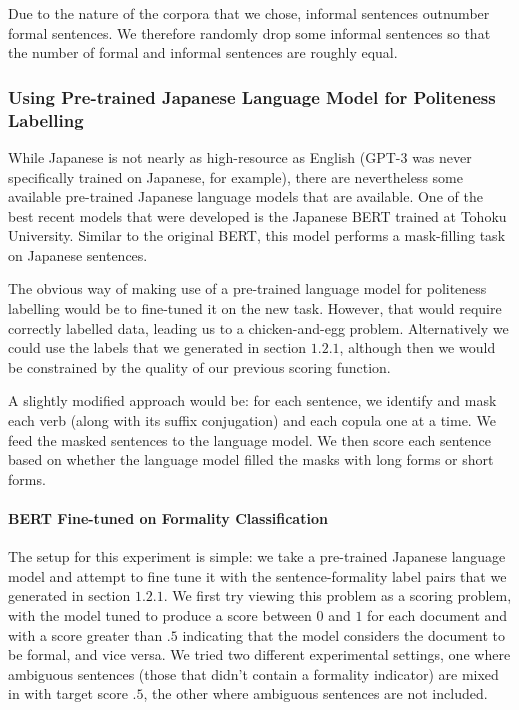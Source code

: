 \documentclass[11pt]{article}
\begin{document}
Due to the nature of the corpora that we chose, informal sentences outnumber formal sentences. We therefore randomly drop some informal sentences so that the number of formal and informal sentences are roughly equal.

\subsubsection{Using Pre-trained Japanese Language Model for Politeness Labelling}

While Japanese is not nearly as high-resource as English (GPT-3 was never specifically trained on Japanese, for example), there are nevertheless some available pre-trained Japanese language models that are available. One of the best recent models that were developed is the Japanese BERT trained at Tohoku University. Similar to the original BERT, this model performs a mask-filling task on Japanese sentences. 

The obvious way of making use of a pre-trained language model for politeness labelling would be to fine-tuned it on the new task. However, that would require correctly labelled data, leading us to a chicken-and-egg problem. Alternatively we could use the labels that we generated in section $1.2.1$, although then we would be constrained by the quality of our previous scoring function.

A slightly modified approach would be: for each sentence, we identify and mask each verb (along with its suffix conjugation) and each copula one at a time. We feed the masked sentences to the language model. We then score each sentence based on whether the language model filled the masks with long forms or short forms.

\paragraph{BERT Fine-tuned on Formality Classification}

The setup for this experiment is simple: we take a pre-trained Japanese language model and attempt to fine tune it with the sentence-formality label pairs that we generated in section $1.2.1$. We first try viewing this problem as a scoring problem, with the model tuned to produce a score between $0$ and $1$ for each document and with a score greater than $.5$ indicating that the model considers the document to be formal, and vice versa. We tried two different experimental settings, one where ambiguous sentences (those that didn't contain a formality indicator) are mixed in with target score $.5$, the other where ambiguous sentences are not included.
\end{document}

